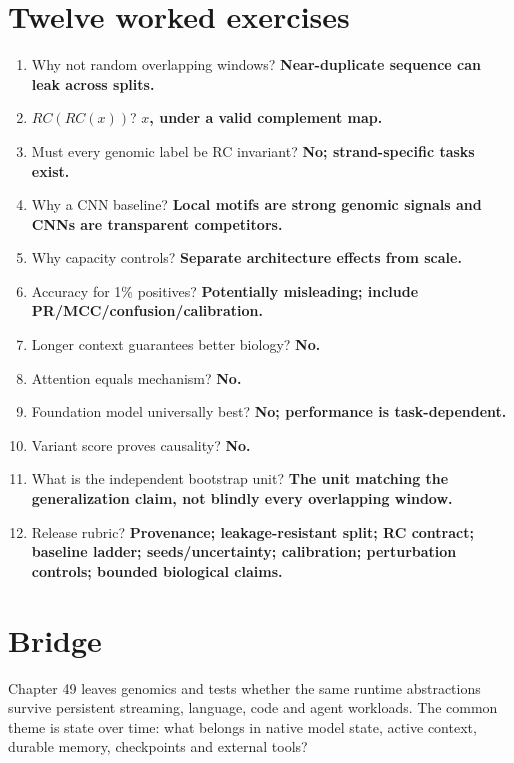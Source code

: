 \section{Twelve worked exercises}
\begin{enumerate}
\item Why not random overlapping windows? \textbf{Near-duplicate sequence can leak across splits.}
\item $RC(RC(x))$? \textbf{$x$, under a valid complement map.}
\item Must every genomic label be RC invariant? \textbf{No; strand-specific tasks exist.}
\item Why a CNN baseline? \textbf{Local motifs are strong genomic signals and CNNs are transparent competitors.}
\item Why capacity controls? \textbf{Separate architecture effects from scale.}
\item Accuracy for 1\% positives? \textbf{Potentially misleading; include PR/MCC/confusion/calibration.}
\item Longer context guarantees better biology? \textbf{No.}
\item Attention equals mechanism? \textbf{No.}
\item Foundation model universally best? \textbf{No; performance is task-dependent.}
\item Variant score proves causality? \textbf{No.}
\item What is the independent bootstrap unit? \textbf{The unit matching the generalization claim, not blindly every overlapping window.}
\item Release rubric? \textbf{Provenance; leakage-resistant split; RC contract; baseline ladder; seeds/uncertainty; calibration; perturbation controls; bounded biological claims.}
\end{enumerate}

\section{Bridge}
Chapter 49 leaves genomics and tests whether the same runtime abstractions survive persistent streaming, language, code and agent workloads. The common theme is state over time: what belongs in native model state, active context, durable memory, checkpoints and external tools?
